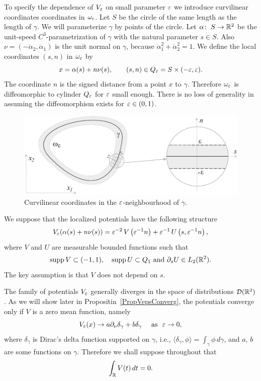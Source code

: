 To specify  the dependence of $V_\varepsilon$ on  small parameter $\varepsilon$ we introduce  curvilinear coordinates coordinates in $\omega_\varepsilon$.
Let $S$ be the circle of the same length as the length of $\gamma$.
We will parameterize $\gamma$ by points of the circle.
Let $\alpha\colon\; S\to \mathbb R^2$ be the unit-speed $C^3$-parametrization of $\gamma$ with the natural parameter $s\in S$.
Also  $\nu=(-\dot{\alpha}_2, \dot{\alpha}_1)$ is the unit normal on $\gamma$, because  $\dot{\alpha}_1^2+\dot{\alpha}_2^2=1$.
We define the local coordinates $(s,n)$ in $\omega_\varepsilon$ by
\begin{equation}\label{LocalTr}
    x=\alpha(s)+n\nu(s), \qquad (s,n)\in Q_\varepsilon=S\times (-\varepsilon, \varepsilon).
\end{equation}
The coordinate $n$ is the signed distance from a point $x$ to $\gamma$.
Therefore  $\omega_\varepsilon$ is diffeomorphic to cylinder $Q_\varepsilon$ for $\varepsilon$ small enough. There is no loss of generality in assuming the diffeomorphism exists for $\varepsilon\in (0,1)$.

\begin{figure}[b]
\centering
\includegraphics[scale=.6]{LocalCoords}
\caption{Curvilinear coordinates in the $\varepsilon$-neighbourhood of $\gamma$.}
\label{FigLocalCoords}
\end{figure}


We suppose that the localized potentials have the following structure
\begin{equation}\label{Veps}
V_\varepsilon(\alpha(s)+n\nu(s))=\varepsilon^{-2}\,V\left(\varepsilon^{-1}n\right)
+\varepsilon^{-1}\,U\left(s,\varepsilon^{-1}n\right),
\end{equation}
where $V$ and $U$ are measurable bounded functions such that
\begin{equation}\label{pdsU}
\mathop{\rm supp} V\subset (-1,1), \quad \mathop{\rm supp} U\subset Q_1 \mbox{ and }\partial_s U\in L_2(\mathbb R^2).
\end{equation}
 The key assumption is that $V$ does not depend on  $s$.

The family of potentials $V_\varepsilon$ generally diverges in the space of distributions $\mathcal{D}(\mathbb R^2)$.
As we will show later in Propositin~\ref{PropVepsConverg},
the  potentials converge only if $V$ is a zero mean function, namely
$$
   V_\varepsilon(x)\to a \partial_\nu\delta_\gamma+b\delta_\gamma\quad \mbox{ as \ }\varepsilon\to 0,
$$
where $\delta_\gamma$ is Dirac's delta function supported on $\gamma$, i.e., $\langle\delta_\gamma, \phi\rangle=\int_\gamma \phi \,d \gamma$,  and $a$, $b$ are some functions on $\gamma$. Therefore we shall suppose throughout that
\begin{equation}\label{Vzeromean}
  \int_\mathbb R V(t)\,dt=0.
\end{equation}

